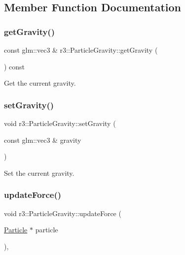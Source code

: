 \subsection{Member Function Documentation}
\mbox{\label{classr3_1_1_particle_gravity_a12488a0a88c2f0b2b94ae29d376d2d03}} 
\subsubsection{\texorpdfstring{get\+Gravity()}{getGravity()}}
{\footnotesize\ttfamily const glm\+::vec3 \& r3\+::\+Particle\+Gravity\+::get\+Gravity (\begin{DoxyParamCaption}{ }\end{DoxyParamCaption}) const}



Get the current gravity. 

\mbox{\label{classr3_1_1_particle_gravity_af5caf366933860ee362f40337d82ae61}} 
\subsubsection{\texorpdfstring{set\+Gravity()}{setGravity()}}
{\footnotesize\ttfamily void r3\+::\+Particle\+Gravity\+::set\+Gravity (\begin{DoxyParamCaption}\item[{const glm\+::vec3 \&}]{gravity }\end{DoxyParamCaption})}



Set the current gravity. 

\mbox{\label{classr3_1_1_particle_gravity_a2730d87272fcc1c29d143f3a7eb8ffa9}} 
\subsubsection{\texorpdfstring{update\+Force()}{updateForce()}}
{\footnotesize\ttfamily void r3\+::\+Particle\+Gravity\+::update\+Force (\begin{DoxyParamCaption}\item[{\mbox{\hyperlink{classr3_1_1_particle}{Particle}} $\ast$}]{particle }\end{DoxyParamCaption})\hspace{0.3cm}{\ttfamily [override]}, {\ttfamily [virtual]}}



